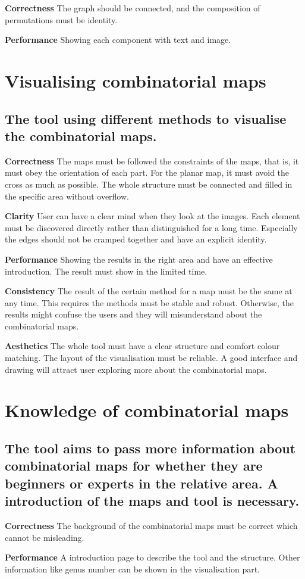 \textbf{Correctness} The graph should be connected, and the composition of permutations must be identity.

\textbf{Performance} Showing each component with text and image.

\section{Visualising combinatorial maps}

\subsection*{The tool using different methods to visualise the combinatorial maps.}

\textbf{Correctness} The maps must be followed the constraints of the maps, that is, it must obey the orientation of each part. For the planar map, it must avoid the cross as much as possible. The whole structure must be connected and filled in the specific area without overflow.

\textbf{Clarity} User can have a clear mind when they look at the images. Each element must be discovered directly rather than distinguished for a long time.  Especially the edges should not be cramped together and have an explicit identity.

\textbf{Performance} Showing the results in the right area and have an effective introduction. The result must show in the limited time.

\textbf{Consistency} The result of the certain method for a map must be the same at any time. This requires the methods must be stable and robust. Otherwise, the results might confuse the users and they will misunderstand about the combinatorial maps.

\textbf{Aesthetics} The whole tool must have a clear structure and comfort colour matching. The layout of the visualisation must be reliable. A good interface and drawing will attract user exploring more about the combinatorial maps.

\section{Knowledge of combinatorial maps}

\subsection*{The tool aims to pass more information about combinatorial maps for whether they are beginners or experts in the relative area.  A introduction of the maps and tool is necessary.}

\textbf{Correctness} The background of the combinatorial maps must be correct which cannot be misleading.

\textbf{Performance} A introduction page to describe the tool and the structure. Other information like genus number can be shown in the visualisation part.

